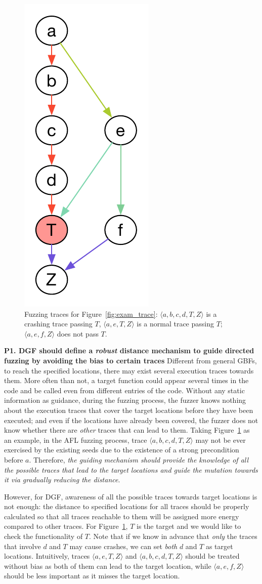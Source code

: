 \begin{figure}[t]
	\centering
	\includegraphics[width=0.11\columnwidth]{res/dfot/eg_callchain.pdf}
	\vspace{-5pt}
	\caption{Fuzzing traces for Figure~\ref{fig:exam_trace}: $\langle a, b, c, d, T, Z\rangle $ is a crashing trace passing $T$,  $\langle a, e, T, Z\rangle$ is a normal trace passing $T$; $\langle a, e, f , Z\rangle$ does not pass $T$.}
	\label{fig:call_chain}
\end{figure}

\textbf{P1. DGF should define a \emph{robust} distance mechanism to guide directed fuzzing by avoiding the bias to certain traces}  \label{subsec:p1}
Different from general GBFs, to reach the specified locations, there may exist several execution traces towards them. More often than not, a target function could appear several times in the code and be called even from different entries of the code. Without any static information as guidance, during the fuzzing process, the fuzzer knows nothing about the execution traces that cover the target locations before they have been executed; and even if the locations have already been covered, the fuzzer does not know whether there are \emph{other} traces that can lead to them.  
Taking Figure~\ref{fig:call_chain} as an example, in the AFL fuzzing process, trace $\langle a, b, c, d, T, Z\rangle$  may not be ever exercised by the existing seeds due to the existence of a strong precondition before $a$. Therefore, \emph{the guiding mechanism should provide the knowledge of all the possible traces that lead to the target locations and guide the mutation towards it via gradually reducing the distance}. 

However, for DGF, awareness of all the possible traces towards target locations is not enough: the distance to specified locations for all traces should be properly calculated so that all traces reachable to them will be assigned more energy compared to other traces. For Figure~\ref{fig:call_chain}, $T$ is the target and we would like to check the functionality of $T$. Note that if we know in advance that \emph{only} the traces that involve $d$ and $T$ may cause crashes, we can set \emph{both} $d$ and $T$ as target locations. Intuitively, traces $ \langle a, e, T, Z\rangle$ and $\langle a, b, c, d, T, Z\rangle$ should be treated without bias as both of them can lead to the target location, while $ \langle a, e, f , Z\rangle$ should be less important as it misses the target location. 



